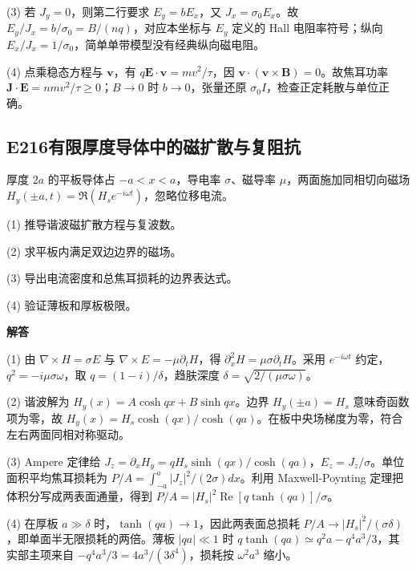 (3) 若 $J_y=0$，则第二行要求 $E_y=bE_x$，又 $J_x=\sigma_0E_x$。故 $E_y/J_x=b/\sigma_0=B/(nq)$，对应本坐标与 $E_y$ 定义的 Hall 电阻率符号；纵向 $E_x/J_x=1/\sigma_0$，简单单带模型没有经典纵向磁电阻。

(4) 点乘稳态方程与 $\mathbf v$，有 $q\mathbf E\cdot\mathbf v=m v^2/\tau$，因 $\mathbf v\cdot(\mathbf v\times\mathbf B)=0$。故焦耳功率 $\mathbf J\cdot\mathbf E=nmv^2/\tau\ge0$；$B\to0$ 时 $b\to0$，张量还原 $\sigma_0I$，检查正定耗散与单位正确。

\par\medskip

\subsection*{E216\quad 有限厚度导体中的磁扩散与复阻抗}

厚度 $2a$ 的平板导体占 $-a<x<a$，导电率 $\sigma$、磁导率 $\mu$，两面施加同相切向磁场 $H_y(\pm a,t)=\Re(H_se^{-i\omega t})$，忽略位移电流。

(1) 推导谐波磁扩散方程与复波数。

(2) 求平板内满足双边边界的磁场。

(3) 导出电流密度和总焦耳损耗的边界表达式。

(4) 验证薄板和厚板极限。

\par\textbf{解答}

(1) 由 $\nabla\times H=\sigma E$ 与 $\nabla\times E=-\mu\partial_tH$，得 $\partial_x^2H=\mu\sigma\partial_tH$。采用 $e^{-i\omega t}$ 约定，$q^2=-i\mu\sigma\omega$，取 $q=(1-i)/\delta$，趋肤深度 $\delta=\sqrt{2/(\mu\sigma\omega)}$。

(2) 谐波解为 $H_y(x)=A\cosh qx+B\sinh qx$。边界 $H_y(\pm a)=H_s$ 意味奇函数项为零，故 $H_y(x)=H_s\cosh(qx)/\cosh(qa)$。在板中央场梯度为零，符合左右两面同相对称驱动。

(3) Ampere 定律给 $J_z=\partial_xH_y=qH_s\sinh(qx)/\cosh(qa)$，$E_z=J_z/\sigma$。单位面积平均焦耳损耗为 $P/A=\int_{-a}^{a}|J_z|^2/(2\sigma)dx$。利用 Maxwell-Poynting 定理把体积分写成两表面通量，得到 $P/A=|H_s|^2\operatorname{Re}[q\tanh(qa)]/\sigma$。

(4) 在厚板 $a\gg\delta$ 时，$\tanh(qa)\to1$，因此两表面总损耗 $P/A\to|H_s|^2/(\sigma\delta)$，即单面半无限损耗的两倍。薄板 $|qa|\ll1$ 时 $q\tanh(qa)\simeq q^2a-q^4a^3/3$，其实部主项来自 $-q^4a^3/3=4a^3/(3\delta^4)$，损耗按 $\omega^2 a^3$ 缩小。

\par\medskip

